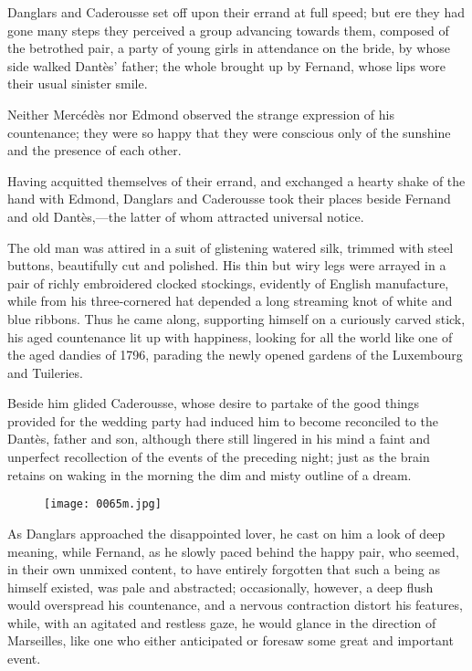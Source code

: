 Danglars and Caderousse set off upon their errand at full speed; but
ere they had gone many steps they perceived a group advancing towards
them, composed of the betrothed pair, a party of young girls in
attendance on the bride, by whose side walked Dantès’ father; the whole
brought up by Fernand, whose lips wore their usual sinister smile.

Neither Mercédès nor Edmond observed the strange expression of his
countenance; they were so happy that they were conscious only of the
sunshine and the presence of each other.

Having acquitted themselves of their errand, and exchanged a hearty
shake of the hand with Edmond, Danglars and Caderousse took their
places beside Fernand and old Dantès,—the latter of whom attracted
universal notice.

The old man was attired in a suit of glistening watered silk, trimmed
with steel buttons, beautifully cut and polished. His thin but wiry
legs were arrayed in a pair of richly embroidered clocked stockings,
evidently of English manufacture, while from his three-cornered hat
depended a long streaming knot of white and blue ribbons. Thus he came
along, supporting himself on a curiously carved stick, his aged
countenance lit up with happiness, looking for all the world like one
of the aged dandies of 1796, parading the newly opened gardens of the
Luxembourg and Tuileries.

Beside him glided Caderousse, whose desire to partake of the good
things provided for the wedding party had induced him to become
reconciled to the Dantès, father and son, although there still lingered
in his mind a faint and unperfect recollection of the events of the
preceding night; just as the brain retains on waking in the morning the
dim and misty outline of a dream.

\begin{figure}[h]
\texttt{[image: 0065m.jpg]}
\end{figure}

As Danglars approached the disappointed lover, he cast on him a look of
deep meaning, while Fernand, as he slowly paced behind the happy pair,
who seemed, in their own unmixed content, to have entirely forgotten
that such a being as himself existed, was pale and abstracted;
occasionally, however, a deep flush would overspread his countenance,
and a nervous contraction distort his features, while, with an agitated
and restless gaze, he would glance in the direction of Marseilles, like
one who either anticipated or foresaw some great and important event.

